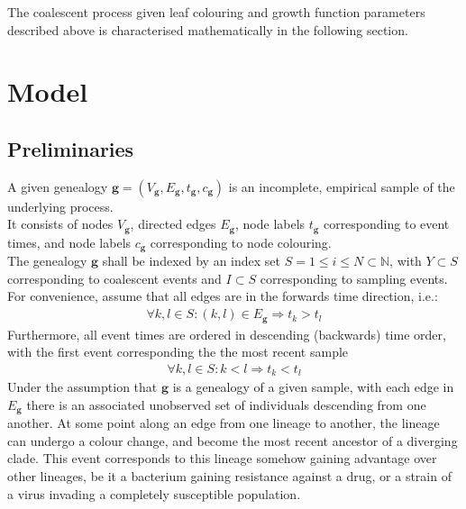 \documentclass{report}
\newcommand{\N}{\mathbb{N}}
\theoremstyle{definition}
\begin{document}
The coalescent process given leaf colouring and growth function parameters described above is characterised mathematically in the following section.
\section{Model}
\subsection{Preliminaries}
A given genealogy $\mathbf{g}=(V_\mathbf{g}, E_\mathbf{g}, t_\mathbf{g}, c_\mathbf{g})$ is an incomplete, empirical sample of the underlying process.\\
It consists of nodes $V_\mathbf{g}$, directed edges $E_\mathbf{g}$, node labels $t_\mathbf{g}$ corresponding to event times, and node labels $c_\mathbf{g}$ corresponding to node colouring.\\
The genealogy $\mathbf{g}$ shall be indexed by an index set $S=1\leq i \leq N\subset \N$, with $Y\subset S$ corresponding to coalescent events and $I\subset S$ corresponding to sampling events.\\
For convenience, assume that all edges are in the forwards time direction, i.e.: 
\begin{gather*}
\forall k,l \in S: (k,l)\in E_\mathbf{g} \Rightarrow t_k>t_l
\end{gather*}
Furthermore, all event times are ordered in descending (backwards) time order, with the first event corresponding the the most recent sample
\begin{gather*}
\forall k,l \in S: k<l \Rightarrow t_k < t_l
\end{gather*}
Under the assumption that $\mathbf{g}$ is a genealogy of a given sample, with each edge in $E_\mathbf{g}$ there is an associated unobserved set of individuals descending from one another. At some point along an edge from one lineage to another, the lineage can undergo a colour change, and become the most recent ancestor of a diverging clade. This event corresponds to this lineage somehow gaining advantage over other lineages, be it a bacterium gaining resistance against a drug, or a strain of a virus invading a completely susceptible population.
\end{document}

